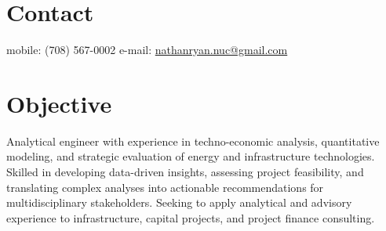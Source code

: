 \documentclass[margin,line]{resume}
\begin{document}
\begin{resume}

%


    \section{\mysidestyle Contact}
    mobile: (708) 567-0002 \hfill e-mail: \href{mailto:nathanryan.nuc@gmail.com}{nathanryan.nuc@gmail.com} \hfill \hfill  \hfill \hspace{0mm}\\\vspace{1mm}%

    \vspace{-6mm}
    \section{\mysidestyle Objective}
        Analytical engineer with experience in techno-economic analysis, quantitative modeling, and strategic evaluation of energy and infrastructure technologies. Skilled in developing data-driven insights, assessing project feasibility, and translating complex analyses into actionable recommendations for multidisciplinary stakeholders. Seeking to apply analytical and advisory experience to infrastructure, capital projects, and project finance consulting.

\end{resume}
\end{document}
